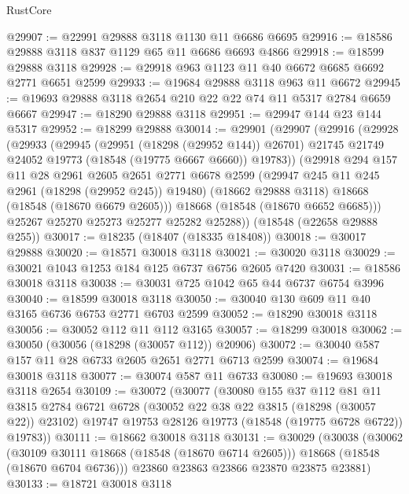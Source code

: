 \begin{lexlean}{RustCore}
\begin{coremodule}
@29907 := @22991 @29888 @3118 @1130 @11 @6686 @6695
@29916 := @18586 @29888 @3118 @837 @1129 @65 @11 @6686 @6693 @4866
@29918 := @18599 @29888 @3118
@29928 := @29918 @963 @1123 @11 @40 @6672 @6685 @6692 @2771 @6651 @2599
@29933 := @19684 @29888 @3118 @963 @11 @6672
@29945 := @19693 @29888 @3118 @2654 @210 @22 @22 @74 @11 @5317 @2784 @6659 @6667
@29947 := @18290 @29888 @3118
@29951 := @29947 @144 @23 @144 @5317
@29952 := @18299 @29888
@30014 := @29901
    (@29907
      (@29916
        (@29928
          (@29933
            (@29945
              (@29951 (@18298 (@29952 @144)) @26701)
              @21745
              @21749
              @24052
              @19773
              (@18548 (@19775 @6667 @6660))
              @19783))
          (@29918
            @294
            @157
            @11
            @28
            @2961
            @2605
            @2651
            @2771
            @6678
            @2599
            (@29947 @245 @11 @245 @2961 (@18298 (@29952 @245)) @19480)
            (@18662 @29888 @3118)
            @18668
            (@18548 (@18670 @6679 @2605)))
          @18668
          (@18548 (@18670 @6652 @6685)))
        @25267
        @25270
        @25273
        @25277
        @25282
        @25288))
    (@18548 (@22658 @29888 @255))
@30017 := @18235 (@18407 (@18335 @18408))
@30018 := @30017 @29888
@30020 := @18571 @30018 @3118
@30021 := @30020 @3118
@30029 := @30021 @1043 @1253 @184 @125 @6737 @6756 @2605 @7420
@30031 := @18586 @30018 @3118
@30038 := @30031 @725 @1042 @65 @44 @6737 @6754 @3996
@30040 := @18599 @30018 @3118
@30050 := @30040 @130 @609 @11 @40 @3165 @6736 @6753 @2771 @6703 @2599
@30052 := @18290 @30018 @3118
@30056 := @30052 @112 @11 @112 @3165
@30057 := @18299 @30018
@30062 := @30050 (@30056 (@18298 (@30057 @112)) @20906)
@30072 := @30040 @587 @157 @11 @28 @6733 @2605 @2651 @2771 @6713 @2599
@30074 := @19684 @30018 @3118
@30077 := @30074 @587 @11 @6733
@30080 := @19693 @30018 @3118 @2654
@30109 := @30072
    (@30077
      (@30080
        @155
        @37
        @112
        @81
        @11
        @3815
        @2784
        @6721
        @6728
        (@30052 @22 @38 @22 @3815 (@18298 (@30057 @22)) @23102)
        @19747
        @19753
        @28126
        @19773
        (@18548 (@19775 @6728 @6722))
        @19783))
@30111 := @18662 @30018 @3118
@30131 := @30029
    (@30038
      (@30062
        (@30109 @30111 @18668 (@18548 (@18670 @6714 @2605)))
        @18668
        (@18548 (@18670 @6704 @6736)))
      @23860
      @23863
      @23866
      @23870
      @23875
      @23881)
@30133 := @18721 @30018 @3118

\end{coremodule}
\end{lexlean}
